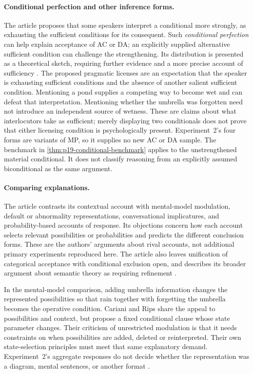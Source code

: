 \paragraph{Conditional perfection and other inference forms.}
The article proposes that some speakers interpret a conditional more strongly,
as exhausting the sufficient conditions for its consequent. Such
\emph{conditional perfection} can help explain acceptance of AC or DA;
an explicitly supplied alternative sufficient condition can challenge the
strengthening. Its distribution is presented as a theoretical sketch,
requiring further evidence and a more precise account of sufficiency
\cite[Sec.~5.6]{CarianiRips2017Suppression}.
The proposed pragmatic licenses are an expectation that the speaker is
exhausting sufficient conditions and the absence of another salient sufficient
condition. Mentioning a pond supplies a competing way to become wet and can
defeat that interpretation. Mentioning whether the umbrella was forgotten
need not introduce an independent source of wetness. These are claims about
what interlocutors take as sufficient; merely displaying two conditionals
does not prove that either licensing condition is psychologically present.
Experiment~2's four forms are variants of MP, so it supplies no new AC or
DA sample. The benchmark in \cref{thm:p19-conditional-benchmark} applies to
the unstrengthened material conditional. It does not classify reasoning
from an explicitly assumed biconditional as the same argument.

\paragraph{Comparing explanations.}
The article contrasts its contextual account with mental-model modulation,
default or abnormality representations, conversational implicatures, and
probability-based accounts of response. Its objections concern how each
account selects relevant possibilities or probabilities and predicts the
different conclusion forms. These are the authors' arguments about rival
accounts, not additional primary experiments reproduced here. The article
also leaves unification of categorical acceptance with conditional exclusion
open, and describes its broader argument about semantic theory as requiring
refinement \cite[Secs.~4.2, 6.1--6.2]{CarianiRips2017Suppression}.

In the mental-model comparison, adding umbrella information changes the
represented possibilities so that rain together with forgetting the umbrella
becomes the operative condition. Cariani and Rips share the appeal to
possibilities and context, but propose a fixed conditional clause whose state
parameter changes. Their criticism of unrestricted modulation is that it
needs constraints on when possibilities are added, deleted or reinterpreted.
Their own state-selection principles must meet that same explanatory demand.
Experiment~2's aggregate responses do not decide whether the representation
was a diagram, mental sentences, or another format
\cite[Sec.~6.1.1]{CarianiRips2017Suppression}.

